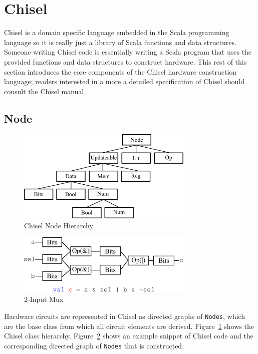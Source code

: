 \section{Chisel}
\label{sec:chisel}
Chisel is a domain specific language embedded in the Scala
programming language so it is really just a library of Scala functions
and data structures. Someone writing Chisel code is essentially writing a Scala
program that uses the provided functions and data structures to
construct hardware. This rest of this section introduces the core
components of the Chisel hardware construction language; readers
interested in a more a detailed specification of Chisel should consult
the Chisel manual. 

\subsection{Node}

\begin{figure}
\centering
\includegraphics[width=0.75\textwidth]{figures/hierarchy.pdf}
\caption{Chisel Node Hierarchy}
\label{fig:hier}
\end{figure}

\begin{figure}
\centering
\includegraphics[width=0.75\textwidth]{figures/mux.pdf}
\caption{2-Input Mux}
\label{fig:mux}
\end{figure}

Hardware circuits are represented in Chisel as directed graphs of
{\tt Nodes}, which are the base class from which all circuit elements are
derived. Figure~\ref{fig:hier} shows the Chisel class
hierarchy. Figure~\ref{fig:mux} shows an example snippet of Chisel
code and the corresponding directed graph of {\tt Nodes} that is constructed.


